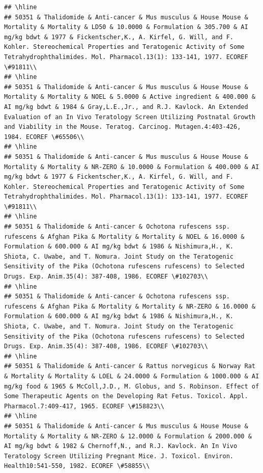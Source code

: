 \documentclass[12pt,]{article}
\begin{document}
\begin{verbatim}
## \hline
## 50351 & Thalidomide & Anti-cancer & Mus musculus & House Mouse & Mortality & Mortality & LD50 & 10.0000 & Formulation & 305.700 & AI mg/kg bdwt & 1977 & Fickentscher,K., A. Kirfel, G. Will, and F. Kohler. Stereochemical Properties and Teratogenic Activity of Some Tetrahydrophthalimides. Mol. Pharmacol.13(1): 133-141, 1977. ECOREF \#91811\\
## \hline
## 50351 & Thalidomide & Anti-cancer & Mus musculus & House Mouse & Mortality & Mortality & NOEL & 5.0000 & Active ingredient & 400.000 & AI mg/kg bdwt & 1984 & Gray,L.E.,Jr., and R.J. Kavlock. An Extended Evaluation of an In Vivo Teratology Screen Utilizing Postnatal Growth and Viability in the Mouse. Teratog. Carcinog. Mutagen.4:403-426, 1984. ECOREF \#65506\\
## \hline
## 50351 & Thalidomide & Anti-cancer & Mus musculus & House Mouse & Mortality & Mortality & NR-ZERO & 10.0000 & Formulation & 400.000 & AI mg/kg bdwt & 1977 & Fickentscher,K., A. Kirfel, G. Will, and F. Kohler. Stereochemical Properties and Teratogenic Activity of Some Tetrahydrophthalimides. Mol. Pharmacol.13(1): 133-141, 1977. ECOREF \#91811\\
## \hline
## 50351 & Thalidomide & Anti-cancer & Ochotona rufescens ssp. rufescens & Afghan Pika & Mortality & Mortality & NOEL & 16.0000 & Formulation & 600.000 & AI mg/kg bdwt & 1986 & Nishimura,H., K. Shiota, C. Uwabe, and T. Nomura. Joint Study on the Teratogenic Sensitivity of the Pika (Ochotona rufescens rufescens) to Selected Drugs. Exp. Anim.35(4): 387-408, 1986. ECOREF \#102703\\
## \hline
## 50351 & Thalidomide & Anti-cancer & Ochotona rufescens ssp. rufescens & Afghan Pika & Mortality & Mortality & NR-ZERO & 16.0000 & Formulation & 600.000 & AI mg/kg bdwt & 1986 & Nishimura,H., K. Shiota, C. Uwabe, and T. Nomura. Joint Study on the Teratogenic Sensitivity of the Pika (Ochotona rufescens rufescens) to Selected Drugs. Exp. Anim.35(4): 387-408, 1986. ECOREF \#102703\\
## \hline
## 50351 & Thalidomide & Anti-cancer & Rattus norvegicus & Norway Rat & Mortality & Mortality & LOEL & 24.0000 & Formulation & 1000.000 & AI mg/kg food & 1965 & McColl,J.D., M. Globus, and S. Robinson. Effect of Some Therapeutic Agents on the Developing Rat Fetus. Toxicol. Appl. Pharmacol.7:409-417, 1965. ECOREF \#158823\\
## \hline
## 50351 & Thalidomide & Anti-cancer & Mus musculus & House Mouse & Mortality & Mortality & NR-ZERO & 12.0000 & Formulation & 2000.000 & AI mg/kg bdwt & 1982 & Chernoff,N., and R.J. Kavlock. An In Vivo Teratology Screen Utilizing Pregnant Mice. J. Toxicol. Environ. Health10:541-550, 1982. ECOREF \#58855\\

\end{verbatim}
\end{document}
